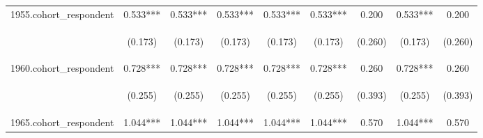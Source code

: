 \begin{center}
\begin{tabular}{lcccccccc}
1955.cohort\_respondent & 0.533*** & 0.533*** & 0.533*** & 0.533*** & 0.533*** & 0.200 & 0.533*** & 0.200 \\
\vspace{4pt} & \begin{footnotesize}(0.173)\end{footnotesize} & \begin{footnotesize}(0.173)\end{footnotesize} & \begin{footnotesize}(0.173)\end{footnotesize} & \begin{footnotesize}(0.173)\end{footnotesize} & \begin{footnotesize}(0.173)\end{footnotesize} & \begin{footnotesize}(0.260)\end{footnotesize} & \begin{footnotesize}(0.173)\end{footnotesize} & \begin{footnotesize}(0.260)\end{footnotesize} \\
1960.cohort\_respondent & 0.728*** & 0.728*** & 0.728*** & 0.728*** & 0.728*** & 0.260 & 0.728*** & 0.260 \\
\vspace{4pt} & \begin{footnotesize}(0.255)\end{footnotesize} & \begin{footnotesize}(0.255)\end{footnotesize} & \begin{footnotesize}(0.255)\end{footnotesize} & \begin{footnotesize}(0.255)\end{footnotesize} & \begin{footnotesize}(0.255)\end{footnotesize} & \begin{footnotesize}(0.393)\end{footnotesize} & \begin{footnotesize}(0.255)\end{footnotesize} & \begin{footnotesize}(0.393)\end{footnotesize} \\
1965.cohort\_respondent & 1.044*** & 1.044*** & 1.044*** & 1.044*** & 1.044*** & 0.570 & 1.044*** & 0.570 \\

\end{tabular}
\end{center}
